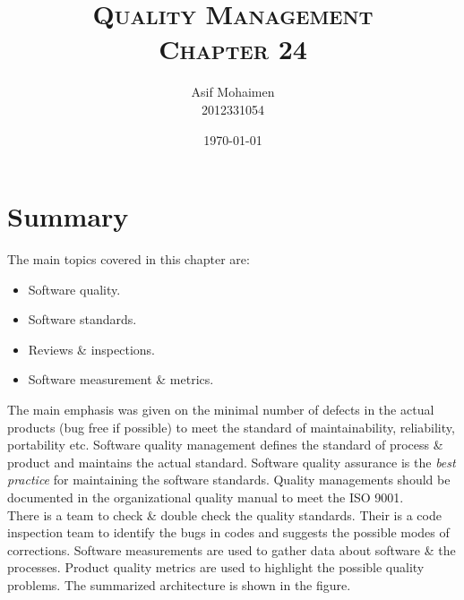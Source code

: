 \documentclass[dvips,12pt]{article}
\begin{document}
\cfoot{\thepage}

\title{
  \textsc{\textbf{Quality Management}\\
  Chapter 24}
}
\author{
  Asif Mohaimen\\
  2012331054\\
}
\date{\today}

\maketitle

\section{Summary}
The main topics covered in this chapter are:
\begin{itemize}
\item Software quality.
\item Software standards.
\item Reviews \& inspections.
\item Software measurement \& metrics. 
\end{itemize}

The main emphasis was given on the minimal number of defects in the actual products (bug free if possible) to meet the standard of maintainability, reliability, portability etc. Software quality management defines the standard of process \& product and maintains the actual standard. Software quality assurance is the \emph{best practice} for maintaining the software standards. Quality managements should be documented in the organizational quality manual to meet the ISO 9001. \\

There is a team to check \& double check the quality standards. Their is a code inspection team to identify the bugs in codes and suggests the possible modes of corrections. Software measurements are used to gather data about software \& the processes. Product quality metrics are used to highlight the possible quality problems. The summarized architecture is shown in the figure.
\end{document}
